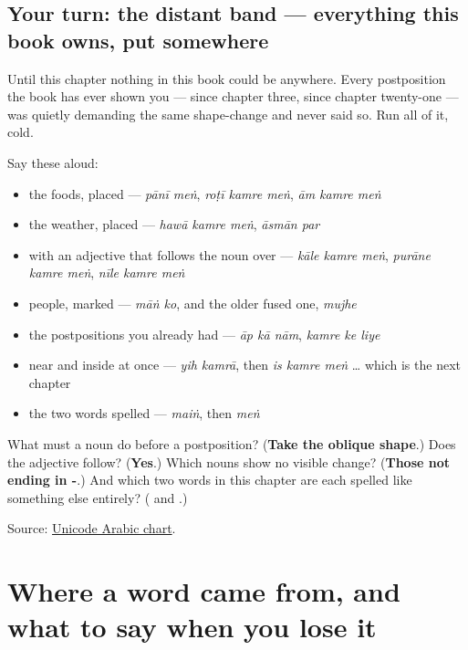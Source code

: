 \subsection*{Your turn: the distant band — everything this book owns, put somewhere}
Until this chapter nothing in this book could be anywhere. Every postposition the book has ever shown you — \textbf{} since chapter three, \textbf{ } since chapter twenty-one — was quietly demanding the same shape-change and never said so. Run all of it, cold.

Say these aloud:

\begin{itemize}
\raggedright
  \item the foods, placed — \emph{pānī meṅ}, \emph{roṭī kamre meṅ}, \emph{ām kamre meṅ}
  \item the weather, placed — \emph{hawā kamre meṅ}, \emph{āsmān par}
  \item with an adjective that follows the noun over — \emph{kāle kamre meṅ}, \emph{purāne kamre meṅ}, \emph{nīle kamre meṅ}
  \item people, marked — \emph{māṅ ko}, and the older fused one, \emph{mujhe}
  \item the postpositions you already had — \emph{āp kā nām}, \emph{kamre ke liye}
  \item near and inside at once — \emph{yih kamrā}, then \emph{is kamre meṅ} … which is the next chapter
  \item the two words spelled  — \emph{maiṅ}, then \emph{meṅ}
\end{itemize}

\begin{tcolorbox}[breakable,colback=teal!4,colframe=teal!35!black,title={Before you move on}]
What must a noun do before a postposition? (\textbf{Take the oblique shape}.) Does the adjective follow? (\textbf{Yes}.) Which nouns show no visible change? (\textbf{Those not ending in -}.) And which two words in this chapter are each spelled like something else entirely? (\textbf{} and \textbf{}.)

Source: \href{https://www.unicode.org/charts/PDF/U0600.pdf}{Unicode Arabic chart}.
\end{tcolorbox}
\section[\texorpdfstring{\ur{کوٹ} · \ur{ہوا} · \ur{آرام} … (koṭ · hawā …)}{کوٹ · ہوا · آرام … (koṭ · hawā …)}]{Where a word came from, and what to say when you lose it}

